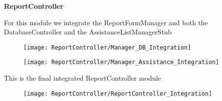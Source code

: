\begin{Large}
\textbf{ReportController}
\end{Large}

For this module we integrate the ReportFormManager and both the DatabaseController and the AssistanceListManagerStub
\begin{figure}[H]
\centering
\texttt{[image: ReportController/Manager\_DB\_Integration]}
\end{figure}

\begin{figure}[H]
\centering
\texttt{[image: ReportController/Manager\_Assistance\_Integration]}
\end{figure}

This is the final integrated ReportController module
\begin{figure}[H]
\centering
\texttt{[image: ReportController/ReportController\_Integration]}
\end{figure}

